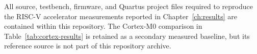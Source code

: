 \documentclass[oneside]{ecsproject}    %
\begin{document}
All source, testbench, firmware, and Quartus project files required to
reproduce the RISC-V accelerator measurements reported in
Chapter~\ref{ch:results} are contained within this repository. The
Cortex-M0 comparison in Table~\ref{tab:cortex-results} is retained as a
secondary measured baseline, but its reference source is not part of this
repository archive.
\end{document}
